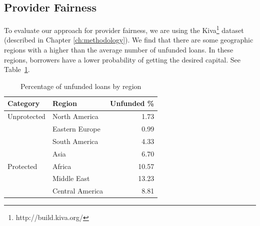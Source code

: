 \subsection{Provider Fairness}

To evaluate our approach for provider fairness, we are using the Kiva\footnote{http://build.kiva.org/} dataset (described in Chapter \ref{ch:methodology}). We find that there are some geographic regions with a higher than the average number of unfunded loans. In these regions, borrowers have a lower probability of getting the desired capital. See Table~\ref{tab:unfunded}.



\begin{table}
    \centering
\begin{tabular}{l|l|r}
    Category & Region & Unfunded \% \\ \hline
    Unprotected & North America & 1.73 \\
    & Eastern Europe & 0.99 \\
    & South America & 4.33 \\
    & Asia & 6.70 \\ \hline
    Protected & Africa & 10.57 \\
    & Middle East & 13.23 \\
    & Central America & 8.81 \\
\end{tabular}
    \caption{Percentage of unfunded loans by region}
    \label{tab:unfunded}
\end{table}


